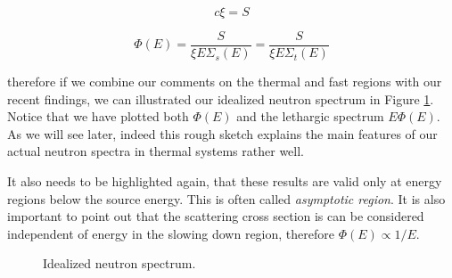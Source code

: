 $$c\xi=S$$

$$\Phi(E)=\frac{S}{\xi E\Sigma_s(E)}=\frac{S}{\xi E\Sigma_t(E)}$$

\noindent therefore if we combine our comments on the thermal and fast regions with our recent findings, we can illustrated our idealized neutron spectrum in Figure \ref{fig:idealneutronspectrum}. Notice that we have plotted both $\Phi(E)$ and the lethargic spectrum $E\Phi(E)$. As we will see later, indeed this rough sketch explains the main features of our actual neutron spectra in thermal systems rather well.

It also needs to be highlighted again, that these results are valid only at energy regions below the source energy. This is often called \textit{asymptotic region}. It is also important to point out that the scattering cross section is can be considered independent of energy in the slowing down region, therefore $\Phi(E)\propto 1/E$.

\begin{figure}[ht!]
\protect {}\protect
\caption{\label{fig:idealneutronspectrum} \footnotesize{Idealized neutron spectrum.}}
\end{figure}

